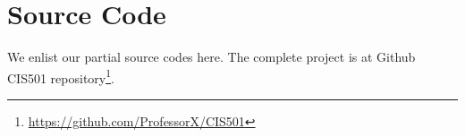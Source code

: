 \documentclass[journal]{IEEEtran}
\begin{document}









%


\appendices
\section{Source Code}

We enlist our partial source codes here. The complete project is at
Github CIS501
repository\footnote{\url{https://github.com/ProfessorX/CIS501}}. 
\end{document}

